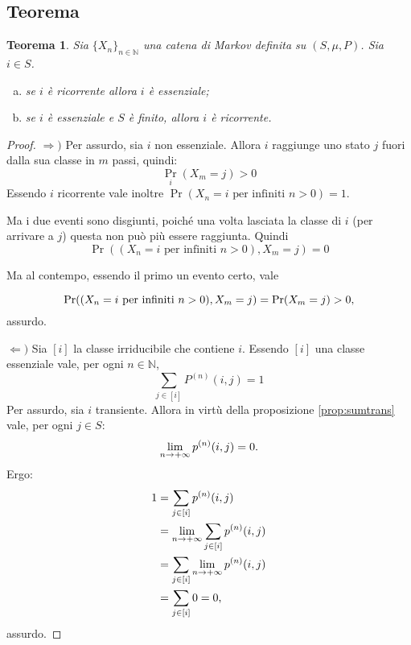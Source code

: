\documentclass{article}
\theoremstyle{plain}
\newtheorem{thm}{Teorema}
\newcommand{\N}{\mathbb N}
\newcommand{\chain}[1]{\{#1_n\}_{n\in\N}}
\begin{document}
\subsection{Teorema}
\begin{thm}
	Sia $\chain X$ una catena di Markov definita su $(S,\mu,P)$. Sia $i\in S$.
	\begin{enumerate}[(a)]
		\item \label{elem:ricess1} se $i$ è ricorrente allora $i$ è essenziale;
		\item \label{elem:ricess2} se $i$ è essenziale e $S$ è finito, allora $i$ è ricorrente.
	\end{enumerate}
\end{thm}
\begin{proof}
	$\Rightarrow)$
	Per assurdo, sia $i$ non essenziale. Allora $i$ raggiunge uno stato $j$ fuori dalla sua classe in $m$ passi, quindi:
	\begin{equation*}
		\Pr_i(X_m=j)>0
	\end{equation*}
	Essendo $i$ ricorrente vale inoltre $\Pr(X_n=i \text{ per infiniti $n>0$})=1$.

	Ma i due eventi sono disgiunti, poiché una volta lasciata la classe di $i$ (per arrivare a $j$) questa non può più essere raggiunta. Quindi
	\begin{equation*}
		\Pr((X_n=i \text{ per infiniti $n>0$}),X_m=j) = 0
	\end{equation*}

	Ma al contempo, essendo il primo un evento certo, vale

	\begin{equation*}
		\Pr((X_n=i \text{ per infiniti $n>0$}),X_m=j) = \Pr(X_m=j)>0 \text,
	\end{equation*}
	assurdo.

	$\Leftarrow)$
	Sia $[i]$ la classe irriducibile che contiene $i$. Essendo $[i]$ una classe essenziale vale, per ogni $n\in\N$,
	\begin{equation*}
		\sum_{j\in[i]} P^{(n)}(i,j) = 1
	\end{equation*}
	Per assurdo, sia $i$ transiente. Allora in virtù della proposizione \ref{prop:sumtrans} vale, per ogni $j\in S$:
	\begin{equation*}
		\lim_{n\to+\infty} p^{(n)}(i,j) = 0 \text.
	\end{equation*}
	Ergo:
	\begin{align*}
		1 & = \sum_{j\in[i]} p^{(n)}(i,j)                    \\
		  & = \lim_{n\to+\infty} \sum_{j\in[i]} p^{(n)}(i,j) \\
		  & = \sum_{j\in[i]} \lim_{n\to+\infty} p^{(n)}(i,j) \\
		  & = \sum_{j\in[i]} 0 = 0 \text,
	\end{align*}
	assurdo. \qedhere
\end{proof}
\end{document}

